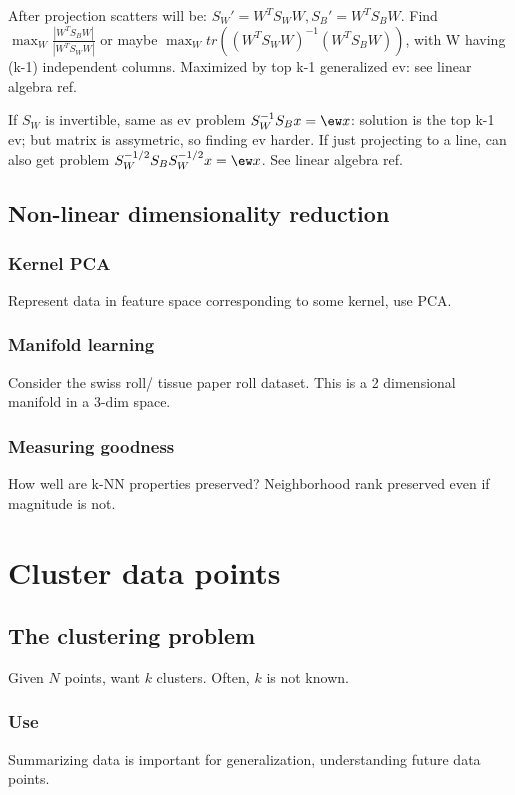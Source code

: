 \documentclass[oneside, article]{memoir}
\begin{document}
After projection scatters will be: $S_{W}' = W^{T}S_{W}W, S_{B}' = W^{T}S_{B}W$. Find $\max_{W} \frac{|W^{T}S_{B}W|}{|W^{T}S_{W}W|}$ or maybe $\max_{W} tr((W^{T}S_{W}W)^{-1}(W^{T}S_{B}W))$, with W having (k-1) independent columns. Maximized by top k-1 generalized ev: see linear algebra ref.

If $S_{W}$ is invertible, same as ev problem $S_{W}^{-1}S_Bx = \ew x$: solution is the top k-1 ev; but matrix is assymetric, so finding ev harder. If just projecting to a line, can also get problem $S_{W}^{-1/2}S_{B}S_{W}^{-1/2}x = \ew x$. See linear algebra ref.

\section{Non-linear dimensionality reduction}
\subsection{Kernel PCA}
Represent data in feature space corresponding to some kernel, use PCA.

\subsection{Manifold learning}
Consider the swiss roll/ tissue paper roll dataset. This is a 2 dimensional manifold in a 3-dim space.

\tbc

\subsection{Measuring goodness}
How well are k-NN properties preserved? Neighborhood rank preserved even if magnitude is not.

\chapter{Cluster data points}
\section{The clustering problem}
Given $N$ points, want $k$ clusters. Often, $k$ is not known.

\subsection{Use}
Summarizing data is important for generalization, understanding future data points.
\end{document}
